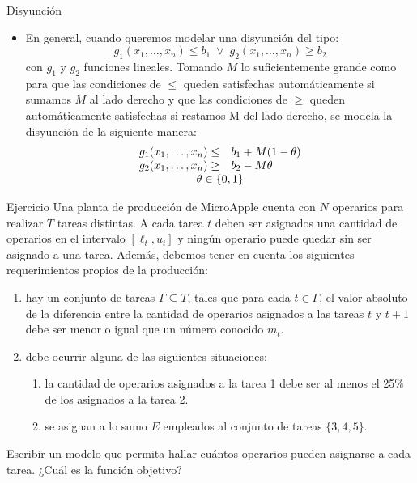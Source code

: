 \documentclass[10pt, aspectratio=169]{beamer}
\begin{document}
\begin{frame}{Disyunción}
    \begin{itemize}
        \item En general, cuando queremos modelar una disyunción del tipo:
        \[ g_1(x_1,\dots, x_n) \leq b_1 \; \vee \; g_2(x_1,\dots, x_n) \geq b_2
        \]
        con $g_1$ y $g_2$ funciones lineales. Tomando $M$ lo suficientemente grande como para que las condiciones de
        $\leq$ queden satisfechas automáticamente si sumamos $M$ al lado derecho y que las condiciones de $\geq$
        queden automáticamente satisfechas si restamos M del lado derecho, se modela la disyunción de la siguiente
        manera:
        \[\begin{array}{rl}
            g_1(x_1,\dots, x_n) \leq & b_1 + M(1-\theta) \\
            g_2(x_1,\dots, x_n) \geq & b_2 - M\theta \\
            \multicolumn{2}{c}{\theta\in\{0,1\}}
        \end{array}
        \]
    \end{itemize}
\end{frame}

\begin{frame}{Ejercicio}
    Una planta de producción de MicroApple cuenta con $N$ operarios para realizar $T$ tareas
    distintas. A cada tarea $t$ deben ser asignados una cantidad de operarios en el intervalo
    $[\ell_t, u_t]$ y ningún operario puede quedar sin ser asignado a una tarea.
    Además, debemos tener en cuenta los siguientes requerimientos propios de la producción:
    \begin{enumerate}
        \item hay un conjunto de tareas $\Gamma\subseteq T$, tales que para cada $t\in \Gamma$, el valor absoluto de la
        diferencia entre la cantidad de operarios asignados a las tareas $t$ y $t+1$ debe ser menor o igual que
        un número conocido $m_t$.
        \item debe ocurrir alguna de las siguientes situaciones:
            \begin{enumerate}
                \item la cantidad de operarios asignados a la tarea 1 debe ser al menos el 25\% de los
                asignados a la tarea 2.
                \item se asignan a lo sumo $E$ empleados al conjunto de tareas $\{3,4,5\}$.
            \end{enumerate}
    \end{enumerate}

    Escribir un modelo que permita hallar cuántos operarios pueden asignarse a cada tarea. ¿Cuál es la función
    objetivo?
\end{frame}
\end{document}
